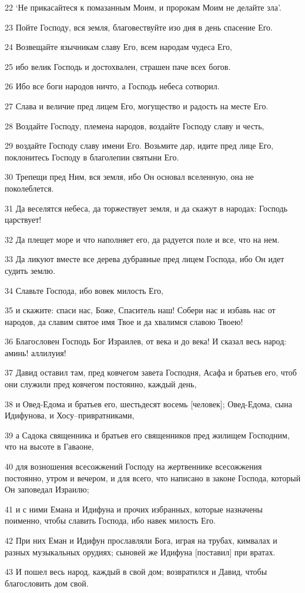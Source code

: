 \par 22 `Не прикасайтеся к помазанным Моим, и пророкам Моим не делайте зла'.
\par 23 Пойте Господу, вся земля, благовествуйте изо дня в день спасение Его.
\par 24 Возвещайте язычникам славу Его, всем народам чудеса Его,
\par 25 ибо велик Господь и достохвален, страшен паче всех богов.
\par 26 Ибо все боги народов ничто, а Господь небеса сотворил.
\par 27 Слава и величие пред лицем Его, могущество и радость на месте Его.
\par 28 Воздайте Господу, племена народов, воздайте Господу славу и честь,
\par 29 воздайте Господу славу имени Его. Возьмите дар, идите пред лице Его, поклонитесь Господу в благолепии святыни Его.
\par 30 Трепещи пред Ним, вся земля, ибо Он основал вселенную, она не поколеблется.
\par 31 Да веселятся небеса, да торжествует земля, и да скажут в народах: Господь царствует!
\par 32 Да плещет море и что наполняет его, да радуется поле и все, что на нем.
\par 33 Да ликуют вместе все дерева дубравные пред лицем Господа, ибо Он идет судить землю.
\par 34 Славьте Господа, ибо вовек милость Его,
\par 35 и скажите: спаси нас, Боже, Спаситель наш! Собери нас и избавь нас от народов, да славим святое имя Твое и да хвалимся славою Твоею!
\par 36 Благословен Господь Бог Израилев, от века и до века! И сказал весь народ: аминь! аллилуия!
\par 37 Давид оставил там, пред ковчегом завета Господня, Асафа и братьев его, чтоб они служили пред ковчегом постоянно, каждый день,
\par 38 и Овед-Едома и братьев его, шестьдесят восемь [человек]; Овед-Едома, сына Идифунова, и Хосу--привратниками,
\par 39 а Садока священника и братьев его священников пред жилищем Господним, что на высоте в Гаваоне,
\par 40 для возношения всесожжений Господу на жертвеннике всесожжения постоянно, утром и вечером, и для всего, что написано в законе Господа, который Он заповедал Израилю;
\par 41 и с ними Емана и Идифуна и прочих избранных, которые назначены поименно, чтобы славить Господа, ибо навек милость Его.
\par 42 При них Еман и Идифун прославляли Бога, играя на трубах, кимвалах и разных музыкальных орудиях; сыновей же Идифуна [поставил] при вратах.
\par 43 И пошел весь народ, каждый в свой дом; возвратился и Давид, чтобы благословить дом свой.

